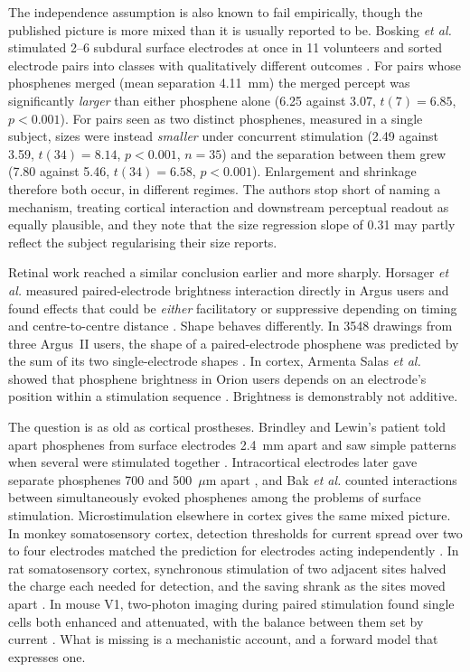 \documentclass[10pt,twocolumn]{article}
\newcommand{\um}{\ensuremath{\mu\text{m}}}
\begin{document}
The independence assumption is also known to fail empirically, though the
published picture is more mixed than it is usually reported to be. Bosking
\textit{et al.} stimulated 2--6 subdural surface electrodes at once in 11
volunteers and sorted electrode pairs into classes with qualitatively
different outcomes \citep{bosking2022}. For pairs whose phosphenes merged
(mean separation 4.11~mm) the merged percept was significantly
\emph{larger} than either phosphene alone (6.25\textdegree{} against
3.07\textdegree, $t(7)=6.85$, $p<0.001$). For pairs seen as two distinct
phosphenes, measured in a single subject, sizes were instead
\emph{smaller} under concurrent stimulation (2.49\textdegree{} against
3.59\textdegree, $t(34)=8.14$, $p<0.001$, $n=35$) and the separation
between them grew (7.80\textdegree{} against 5.46\textdegree,
$t(34)=6.58$, $p<0.001$). Enlargement and shrinkage therefore both occur,
in different regimes. The authors stop short of naming a mechanism,
treating cortical interaction and downstream perceptual readout as equally
plausible, and they note that the size regression slope of 0.31 may partly
reflect the subject regularising their size reports.

Retinal work reached a similar conclusion earlier and more sharply.
Horsager \textit{et al.} measured paired-electrode brightness interaction
directly in Argus users and found effects that could be
\emph{either} facilitatory or suppressive depending on timing and
centre-to-centre distance \citep{horsager2010,horsager2011}. Shape behaves
differently. In 3548 drawings from three Argus~II users, the shape of a
paired-electrode phosphene was predicted by the sum of its two
single-electrode shapes \citep{hou2024}. In cortex, Armenta Salas
\textit{et al.} showed that phosphene brightness in Orion users depends on
an electrode's position within a stimulation sequence
\citep{armentasalas2022}. Brightness is demonstrably not additive.

The question is as old as cortical prostheses. Brindley and Lewin's
patient told apart phosphenes from surface electrodes 2.4~mm apart and saw
simple patterns when several were stimulated together
\citep{brindley1968}. Intracortical electrodes later gave separate
phosphenes 700 and 500~\um{} apart \citep{bak1990,schmidt1996}, and Bak
\textit{et al.} counted interactions between simultaneously evoked
phosphenes among the problems of surface stimulation. Microstimulation
elsewhere in cortex gives the same mixed picture. In monkey somatosensory
cortex, detection thresholds for current spread over two to four
electrodes matched the prediction for electrodes acting independently
\citep{kim2015}. In rat somatosensory cortex, synchronous stimulation of
two adjacent sites halved the charge each needed for detection, and the
saving shrank as the sites moved apart \citep{kunigk2022}. In mouse V1,
two-photon imaging during paired stimulation found single cells both
enhanced and attenuated, with the balance between them set by current
\citep{kim2025}. What is missing is a mechanistic account, and a forward
model that expresses one.
\end{document}
